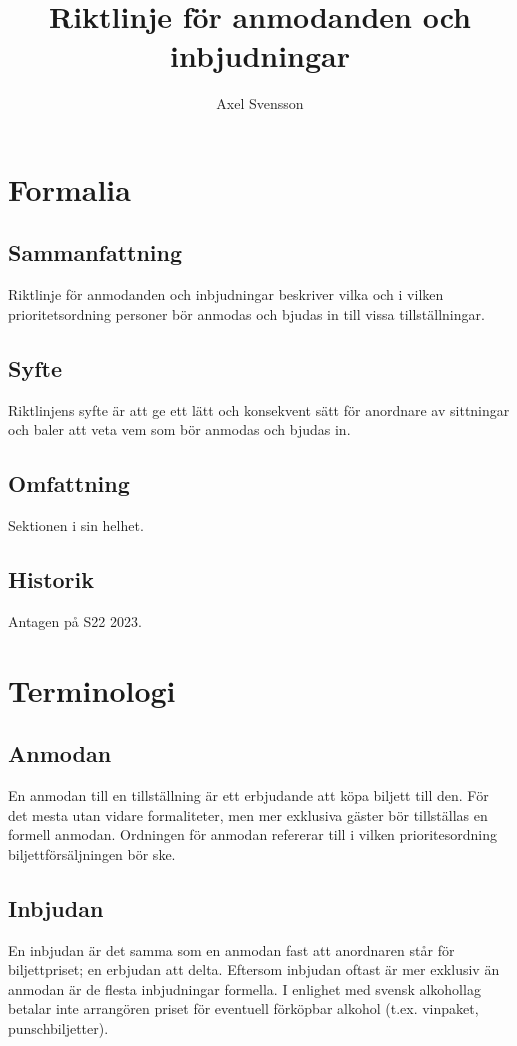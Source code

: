 \documentclass{dsekprotokoll}
\author{Axel Svensson}
\title{Riktlinje för anmodanden och inbjudningar}
\begin{document}
\maketitle
\section{Formalia}
\subsection{Sammanfattning}
Riktlinje för anmodanden och inbjudningar beskriver vilka och i vilken prioritetsordning personer bör anmodas och
bjudas in till vissa tillställningar.

\subsection{Syfte}
Riktlinjens syfte är att ge ett lätt och konsekvent sätt för anordnare av sittningar och baler att veta vem som bör anmodas och bjudas in.

\subsection{Omfattning}
Sektionen i sin helhet.

\subsection{Historik}
Antagen på S22 2023.

\section{Terminologi}

\subsection{Anmodan}
En anmodan till en tillställning är ett erbjudande att köpa
biljett till den. För det mesta utan vidare formaliteter, men
mer exklusiva gäster bör tillställas en formell anmodan. Ordningen
för anmodan refererar till i vilken prioritesordning biljettförsäljningen bör ske.


\subsection{Inbjudan}
En inbjudan är det samma som en anmodan fast att anordnaren står för biljettpriset; en erbjudan att delta. Eftersom
inbjudan oftast är mer exklusiv än anmodan är de flesta inbjudningar formella.
I enlighet med svensk alkohollag betalar inte arrangören priset för eventuell förköpbar alkohol (t.ex. vinpaket, punschbiljetter).
\end{document}
